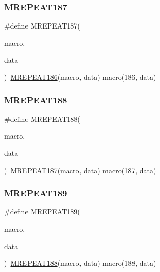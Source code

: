 \mbox{\label{group__group__sam0__utils__mrepeat_ga694587833aed28be3a88e364ef3adbd3}} 
\subsubsection{\texorpdfstring{MREPEAT187}{MREPEAT187}}
{\footnotesize\ttfamily \#define M\+R\+E\+P\+E\+A\+T187(\begin{DoxyParamCaption}\item[{}]{macro,  }\item[{}]{data }\end{DoxyParamCaption})~\mbox{\hyperlink{group__group__sam0__utils__mrepeat_gaffac3b38c0b0a12816b6620ebd99d6a9}{M\+R\+E\+P\+E\+A\+T186}}(macro, data)   macro(186, data)}

\mbox{\label{group__group__sam0__utils__mrepeat_ga58e111ce05110cc0fe761789c2ec761a}} 
\subsubsection{\texorpdfstring{MREPEAT188}{MREPEAT188}}
{\footnotesize\ttfamily \#define M\+R\+E\+P\+E\+A\+T188(\begin{DoxyParamCaption}\item[{}]{macro,  }\item[{}]{data }\end{DoxyParamCaption})~\mbox{\hyperlink{group__group__sam0__utils__mrepeat_ga694587833aed28be3a88e364ef3adbd3}{M\+R\+E\+P\+E\+A\+T187}}(macro, data)   macro(187, data)}

\mbox{\label{group__group__sam0__utils__mrepeat_ga691dc645795e6f5cb2083e198a7af972}} 
\subsubsection{\texorpdfstring{MREPEAT189}{MREPEAT189}}
{\footnotesize\ttfamily \#define M\+R\+E\+P\+E\+A\+T189(\begin{DoxyParamCaption}\item[{}]{macro,  }\item[{}]{data }\end{DoxyParamCaption})~\mbox{\hyperlink{group__group__sam0__utils__mrepeat_ga58e111ce05110cc0fe761789c2ec761a}{M\+R\+E\+P\+E\+A\+T188}}(macro, data)   macro(188, data)}

